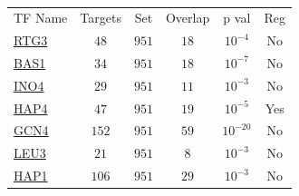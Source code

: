 \begin{table}[h!]
\centering 
{}
\begin{tabular}{l c c c c c}
\hline

TF Name &	Targets &	Set &	Overlap &	p val &	Reg \\ 
\href{www.yeastgenome.org/cgi-bin/locus.fpl?locus=RTG3}{RTG3} &	 $48$ &	$951$&	$18$ &	$10^{-4}$ & 	 No \\ 
\href{www.yeastgenome.org/cgi-bin/locus.fpl?locus=BAS1}{BAS1} &	 $34$ &	$951$&	$18$ &	$10^{-7}$ & 	 No \\ 
\href{www.yeastgenome.org/cgi-bin/locus.fpl?locus=INO4}{INO4} &	 $29$ &	$951$&	$11$ &	$10^{-3}$ & 	 No \\ 
\href{www.yeastgenome.org/cgi-bin/locus.fpl?locus=HAP4}{HAP4} &	 $47$ &	$951$&	$19$ &	$10^{-5}$ & 	 Yes \\ 
\href{www.yeastgenome.org/cgi-bin/locus.fpl?locus=GCN4}{GCN4} &	 $152$ &	$951$&	$59$ &	$10^{-20}$ & 	 No \\ 
\href{www.yeastgenome.org/cgi-bin/locus.fpl?locus=LEU3}{LEU3} &	 $21$ &	$951$&	$8$ &	$10^{-3}$ & 	 No \\ 
\href{www.yeastgenome.org/cgi-bin/locus.fpl?locus=HAP1}{HAP1} &	 $106$ &	$951$&	$29$ &	$10^{-3}$ & 	 No \\ 
\hline
\end{tabular} 
\caption[]{}
\label{}
\end{table} 


